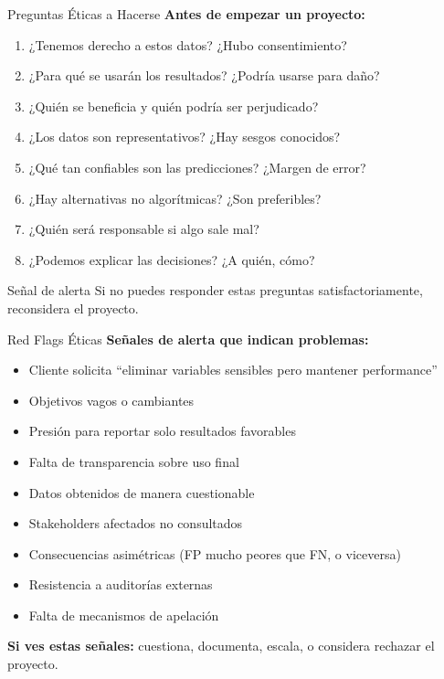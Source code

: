 \documentclass[aspectratio=169]{beamer}
\begin{document}
\begin{frame}{Preguntas Éticas a Hacerse}
\textbf{Antes de empezar un proyecto:}

\begin{enumerate}
\item ¿Tenemos derecho a estos datos? ¿Hubo consentimiento?
\item ¿Para qué se usarán los resultados? ¿Podría usarse para daño?
\item ¿Quién se beneficia y quién podría ser perjudicado?
\item ¿Los datos son representativos? ¿Hay sesgos conocidos?
\item ¿Qué tan confiables son las predicciones? ¿Margen de error?
\item ¿Hay alternativas no algorítmicas? ¿Son preferibles?
\item ¿Quién será responsable si algo sale mal?
\item ¿Podemos explicar las decisiones? ¿A quién, cómo?
\end{enumerate}

\vspace{0.3cm}

\begin{alertblock}{Señal de alerta}
Si no puedes responder estas preguntas satisfactoriamente, reconsidera el proyecto.
\end{alertblock}
\end{frame}

\begin{frame}{Red Flags Éticas}
\textbf{Señales de alerta que indican problemas:}

\begin{itemize}
\item Cliente solicita ``eliminar variables sensibles pero mantener performance''
\item Objetivos vagos o cambiantes
\item Presión para reportar solo resultados favorables
\item Falta de transparencia sobre uso final
\item Datos obtenidos de manera cuestionable
\item Stakeholders afectados no consultados
\item Consecuencias asimétricas (FP mucho peores que FN, o viceversa)
\item Resistencia a auditorías externas
\item Falta de mecanismos de apelación
\end{itemize}

\vspace{0.3cm}

\textbf{Si ves estas señales:} cuestiona, documenta, escala, o considera rechazar el proyecto.
\end{frame}
\end{document}
